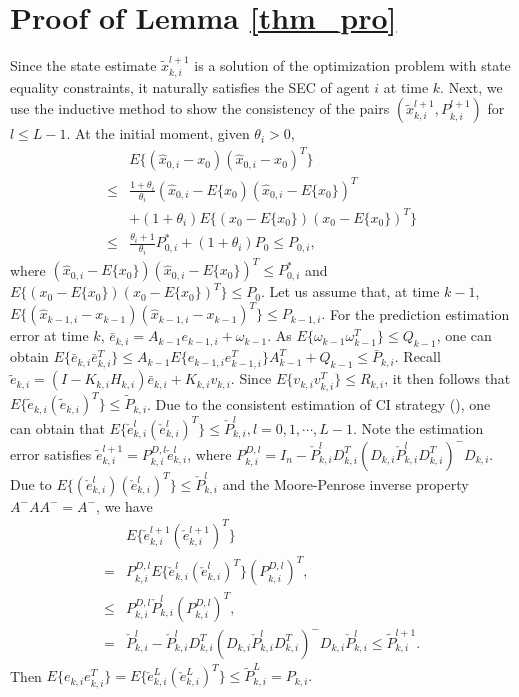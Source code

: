 \documentclass[journal,transmag]{IEEEtran}
\begin{document}
{	
	\section{Proof of Lemma \ref{thm_pro}}\label{pf_th1}
	 Since the state estimate $\tilde x_{k,i}^{l+1}$ is a solution of the optimization problem with state equality constraints, it naturally  satisfies the SEC of agent $i$ at time $k$. Next, we use the inductive method to show the consistency of the pairs $(\tilde x_{k,i}^{l+1},P_{k,i}^{l+1})$ for $l\leq L-1$. 
		At the initial moment, given $\theta_i>0$,
	\begin{align*}
	&E\{(\hat x_{0,i}-x_{0})(\hat x_{0,i}-x_{0})^T\}\\
	\leq&\frac{1+\theta_i}{\theta_i}(\hat x_{0,i}-E\{x_{0})(\hat x_{0,i}-E\{x_{0}\})^T\\
	&+(1+\theta_i)E\{(x_{0}-E\{x_{0}\})(x_{0}-E\{x_{0}\})^T\}\\
	\leq&\frac{\theta_i+1}{\theta_i}P_{0,i}^*+(1+\theta_i)P_0\leq P_{0,i},
	\end{align*}
	where $(\hat x_{0,i}-E\{x_0\})(\hat x_{0,i}-E\{x_0\})^T\leq P_{0,i}^*$ and $E\{(x_{0}-E\{x_{0}\})(x_{0}-E\{x_{0}\})^T\}\leq P_{0}$.	
	Let us assume that, at  time $k-1$, $E\{(\hat x_{k-1,i}-x_{k-1})(\hat x_{k-1,i}-x_{k-1})^T\} \leq P_{k-1,i}.$
	For the prediction estimation error at time $k$,  $\bar e_{k,i}=A_{k-1}e_{k-1,i}+\omega_{k-1}.$
	As $E\{\omega_{k-1}\omega_{k-1}^T\}\leq Q_{k-1}$, one can obtain $E\{\bar e_{k,i}\bar e_{k,i}^T\}\leq  A_{k-1}E\{e_{k-1,i}e_{k-1,i}^T\}A_{k-1}^T+Q_{k-1}\leq \bar P_{k,i}$.
	Recall $\tilde e_{k,i}=(I-K_{k,i}H_{k,i})\bar e_{k,i}+K_{k,i}v_{k,i}.$
	Since $E\{v_{k,i}v_{k,i}^T\}\leq R_{k,i}$, it then follows that $E\{\tilde e_{k,i}(\tilde e_{k,i})^T\}\leq \tilde P_{k,i}$. 
	Due to the consistent estimation of CI strategy (\cite{Julier1997A}), one can obtain that $	E\{\check e_{k,i}^l(\check e_{k,i}^l)^T\}\leq \check P_{k,i}^l, l=0,1,\cdots,L-1.$	
	Note the estimation error satisfies $\tilde e_{k,i}^{l+1}=P_{k,i}^{D,l}\check  e_{k,i}^{l}$,
	where $P_{k,i}^{D,l}= I_n-\check P_{k,i}^lD_{k,i}^T(D_{k,i}\check P_{k,i}^lD_{k,i}^T)^{-}D_{k,i}$. Due to $E\{(\check e_{k,i}^l)(\check e_{k,i}^l)^T\}\leq \check P_{k,i}^l$ and the Moore-Penrose inverse property $A^-AA^-=A^-$,
we have
	\begin{equation*}\label{pf2_12}
	\begin{split}
	&	E\{\check e_{k,i}^{l+1}(\check e_{k,i}^{l+1})^T\}\\
	=&P_{k,i}^{D,l}E\{\check e_{k,i}^l(\check e_{k,i}^l)^T\}(P_{k,i}^{D,l} )^T,\\
	\leq &P_{k,i}^{D,l} \check P_{k,i}^l(P_{k,i}^{D,l} )^T,\\
	=&\check P_{k,i}^l-\check P_{k,i}^lD_{k,i}^T(D_{k,i}\check P_{k,i}^lD_{k,i}^T)^{-}D_{k,i}\check P_{k,i}^l\leq \tilde P_{k,i}^{l+1}.
	\end{split}
	\end{equation*}		
	Then $E\{e_{k,i}e_{k,i}^T\}=E\{\check e_{k,i}^{L}(\check e_{k,i}^{L})^T\} \leq \tilde P_{k,i}^{L}=P_{k,i}.$	
}
\end{document}
